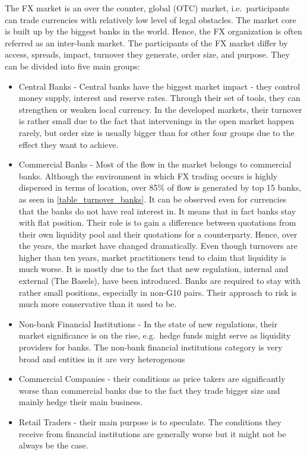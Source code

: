 \documentclass[]{article}
\providecommand{\tightlist}{%
  \setlength{\itemsep}{0pt}\setlength{\parskip}{0pt}}
\begin{document}
The FX market is an over the counter, global (OTC) market,
i.e.~participants can trade currencies with relatively low level of
legal obstacles. The market core is built up by the biggest banks in the
world. Hence, the FX organization is often referred as an inter-bank
market. The participants of the FX market differ by access, spreads,
impact, turnover they generate, order size, and purpose. They can be
divided into five main groups:

\begin{itemize}
\tightlist
\item
  Central Banks - Central banks have the biggest market impact - they
  control money supply, interest and reserve rates. Through their set of
  tools, they can strengthen or weaken local currency. In the developed
  markets, their turnover is rather small due to the fact that
  intervenings in the open market happen rarely, but order size is
  usually bigger than for other four groups due to the effect they want
  to achieve.
\item
  Commercial Banks - Most of the flow in the market belongs to
  commercial banks. Although the environment in which FX trading occurs
  is highly dispersed in terms of location, over 85\% of flow is
  generated by top 15 banks, as seen in \ref{table_turnover_banks}. It
  can be observed even for currencies that the banks do not have real
  interest in. It means that in fact banks stay with flat position.
  Their role is to gain a difference between quotations from their own
  liquidity pool and their quotations for a counterparty. Hence, over
  the years, the market have changed dramatically. Even though turnovers
  are higher than ten years, market practitioners tend to claim that
  liquidity is much worse. It is mostly due to the fact that new
  regulation, internal and external (The Basels), have been introduced.
  Banks are required to stay with rather small positions, especially in
  non-G10 pairs. Their approach to risk is much more conservative than
  it used to be.
\item
  Non-bank Financial Institutions - In the state of new regulations,
  their market significance is on the rise, e.g.~hedge funds might serve
  as liquidity providers for banks. The non-bank financial institutions
  category is very broad and entities in it are very heterogenous
\item
  Commercial Companies - their conditions as price takers are
  significantly worse than commercial banks due to the fact they trade
  bigger size and mainly hedge their main business.
\item
  Retail Traders - their main purpose is to speculate. The conditions
  they receive from financial institutions are generally worse but it
  might not be always be the case.
\end{itemize}
\end{document}
